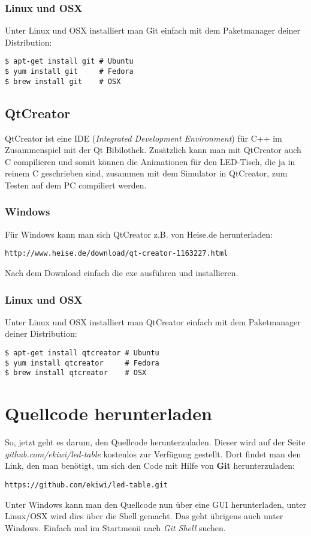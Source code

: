 \documentclass[10pt,a4paper]{article}
\begin{document}
\subsubsection{Linux und OSX}
Unter Linux und OSX installiert man Git einfach mit dem Paketmanager deiner Distribution:
\begin{lstlisting}
$ apt-get install git # Ubuntu
$ yum install git     # Fedora
$ brew install git    # OSX
\end{lstlisting}

\subsection{QtCreator}
QtCreator ist eine IDE (\textit{Integrated Development Environment}) für C++ im Zusammenspiel mit der Qt Bibilothek.
Zusätzlich kann man mit QtCreator auch C compilieren und somit können die Animationen für den LED-Tisch, die ja in reinem C geschrieben sind, zusammen mit dem Simulator in QtCreator, zum Testen auf dem PC compiliert werden.

\subsubsection{Windows}
Für Windows kann man sich QtCreator z.B. von Heise.de herunterladen:
\begin{lstlisting}
http://www.heise.de/download/qt-creator-1163227.html
\end{lstlisting}
Nach dem Download einfach die exe ausführen und installieren.

\subsubsection{Linux und OSX}
Unter Linux und OSX installiert man QtCreator einfach mit dem Paketmanager deiner Distribution:
\begin{lstlisting}
$ apt-get install qtcreator # Ubuntu
$ yum install qtcreator     # Fedora
$ brew install qtcreator    # OSX
\end{lstlisting}

\section{Quellcode herunterladen}
So, jetzt geht es darum, den Quellcode herunterzuladen. Dieser wird auf der Seite \textit{github.com/ekiwi/led-table} kostenlos zur Verfügung gestellt.
Dort findet man den Link, den man benötigt, um sich den Code mit Hilfe von \textbf{Git} herunterzuladen:
\begin{lstlisting}
https://github.com/ekiwi/led-table.git
\end{lstlisting}
Unter Windows kann man den Quellcode nun über eine GUI herunterladen, unter Linux/OSX wird dies über die Shell gemacht. Das geht übrigens auch unter Windows. Einfach mal im Startmenü nach \textit{Git Shell} suchen.
\end{document}
